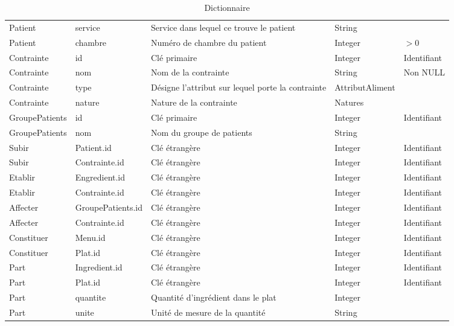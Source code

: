 \begin{table}
\begin{tabular}{llp{5cm}ll}
  Patient & service & Service dans lequel ce trouve le patient & String & \\
  Patient & chambre & Numéro de chambre du patient & Integer & $> 0$ \\ \hline
  Contrainte & id & Clé primaire & Integer & Identifiant \\
  Contrainte & nom & Nom de la contrainte & String & Non NULL \\
  Contrainte & type & Désigne l'attribut sur lequel porte la contrainte & AttributAliment &  \\
  Contrainte & nature & Nature de la contrainte & Natures & \\ \hline
  GroupePatients & id & Clé primaire & Integer & Identifiant \\
  GroupePatients & nom & Nom du groupe de patients & String & \\ \hline
  Subir & Patient.id & Clé étrangère & Integer & Identifiant \\
  Subir & Contrainte.id & Clé étrangère & Integer & Identifiant \\ \hline
  Etablir & Engredient.id & Clé étrangère & Integer & Identifiant \\
  Etablir & Contrainte.id & Clé étrangère & Integer & Identifiant \\ \hline
  Affecter & GroupePatients.id & Clé étrangère & Integer & Identifiant \\
  Affecter & Contrainte.id & Clé étrangère & Integer & Identifiant \\ \hline
  Constituer & Menu.id & Clé étrangère & Integer & Identifiant \\
  Constituer & Plat.id & Clé étrangère & Integer & Identifiant \\ \hline
  Part & Ingredient.id & Clé étrangère & Integer & Identifiant \\
  Part & Plat.id & Clé étrangère & Integer & Identifiant \\
  Part & quantite & Quantité d'ingrédient dans le plat & Integer & \\
  Part & unite & Unité de mesure de la quantité & String & \\ \hline
\end{tabular}
\caption{Dictionnaire}
\label{DictionnaireMDD}
\end{table}

